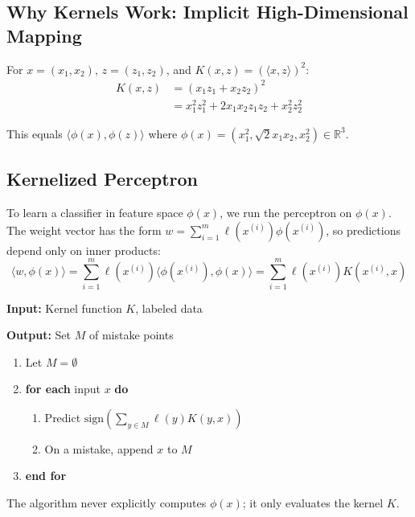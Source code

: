 \documentclass[main.tex]{subfiles}
\begin{document}
\subsection{Why Kernels Work: Implicit High-Dimensional Mapping}

\begin{example}
For $x = (x_1, x_2)$, $z = (z_1, z_2)$, and $K(x, z) = (\langle x, z \rangle)^2$:
\begin{align}
K(x, z) &= (x_1 z_1 + x_2 z_2)^2 \\[6pt]
&= x_1^2 z_1^2 + 2x_1 x_2 z_1 z_2 + x_2^2 z_2^2
\end{align}

This equals $\langle \phi(x), \phi(z) \rangle$ where $\phi(x) = (x_1^2, \sqrt{2}x_1 x_2, x_2^2) \in \mathbb{R}^3$.
\end{example}

\subsection{Kernelized Perceptron}

To learn a classifier in feature space $\phi(x)$, we run the perceptron on $\phi(x)$. The weight vector has the form $w = \sum_{i=1}^{m} \ell(x^{(i)})\phi(x^{(i)})$, so predictions depend only on inner products:
$$\langle w, \phi(x) \rangle = \sum_{i=1}^{m} \ell(x^{(i)}) \langle \phi(x^{(i)}), \phi(x) \rangle = \sum_{i=1}^{m} \ell(x^{(i)}) K(x^{(i)}, x)$$

\begin{algorithm}
\textbf{Input:} Kernel function $K$, labeled data

\textbf{Output:} Set $M$ of mistake points

\begin{enumerate}
    \item Let $M = \emptyset$
    \item \textbf{for each} input $x$ \textbf{do}
    \begin{enumerate}
        \item Predict $\text{sign}\left(\sum_{y \in M} \ell(y) K(y, x)\right)$
        \item On a mistake, append $x$ to $M$
    \end{enumerate}
    \item \textbf{end for}
\end{enumerate}
\end{algorithm}

The algorithm never explicitly computes $\phi(x)$; it only evaluates the kernel $K$.
\end{document}

